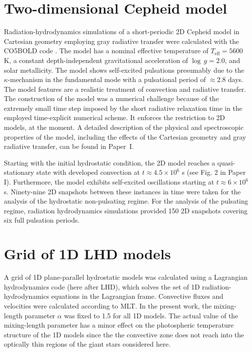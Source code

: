 \documentclass{aa}
\begin{document}
\section{Two-dimensional Cepheid model}
Radiation-hydrodynamics simulations of a short-periodic 
2D Cepheid model in  Cartesian
geometry   employing gray 
radiative transfer  were calculated with the CO5BOLD code \citep{2012JCoPh.231..919F}.
The model has a nominal effective temperature of 
$T_\mathrm{eff}=5600$ K, a constant depth-independent 
gravitational acceleration  of
$\log\,g=2.0$, and solar metallicity.  
The model shows self-excited  pulsations presumably 
due to the $\kappa$-mechanism 
\citep{1917Obs....40..290E, 1963ARA&A...1..367Z}  
in the fundamental mode  with a pulsational period of $\approx2.8$ days.
The model features are a realistic treatment  of convection and radiative transfer.  
The construction of the model was a numerical challenge because of the 
extremely small time step imposed by the short radiative relaxation 
time in the employed time-explicit numerical scheme. It enforces the restriction to 2D models, 
at the moment.  A detailed description of
the physical and spectroscopic properties of the model, including the effects of the 
Cartesian geometry and  gray radiative transfer, can be found in Paper~I.

Starting with the initial hydrostatic condition, the 2D model reaches 
a quasi-stationary state with developed convection at $t \approx 4.5 \times 10^6$ s
 (see Fig. 2 in Paper I). Furthermore,  the model exhibits self-excited 
oscillations starting at $t \approx 6\times 10^6$ s. Ninety-nine 2D  snapshots between these instances in time were taken 
for the analysis of the hydrostatic non-pulsating regime.
For the analysis of the pulsating regime, radiation hydrodynamics simulations  
provided  150 2D snapshots  covering six full pulsation periods.

\section{Grid of 1D LHD models}

A grid of 1D plane-parallel hydrostatic models was calculated  using a
Lagrangian hydrodynamics code (here after LHD), 
which solves the set of 1D radiation-hydrodynamics equations in the
Lagrangian frame.  Convective fluxes and velocities were calculated according
to MLT.  In the present work, the mixing-length parameter $\alpha$ was fixed to
1.5 for all 1D models.  The actual value of the mixing-length parameter has a
minor effect on the photospheric temperature structure of the 1D models since
the the convective zone does not reach into the optically thin regions of the
giant stars considered here.
\end{document}
